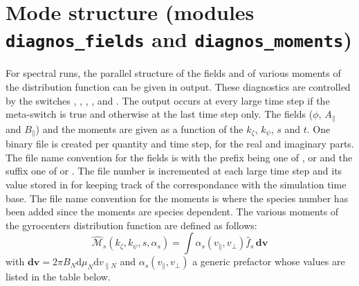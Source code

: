 \section{Mode structure (modules \texttt{diagnos\_fields} and \texttt{diagnos\_moments}) \label{sec.kykxs}}
For spectral runs, the parallel structure of the fields and of various moments of the distribution function can be given in output. These diagnostics are controlled by the switches , , , ,  and . The output occurs at every large time step if the meta-switch  is true and otherwise at the last time step only. 
The fields ($\phi$, $A_\parallel$ and $B_\parallel$) and the moments are given as a function of the $k_\zeta$, $k_\psi$, $s$ and $t$. 
One binary file is created per quantity and time step, for the real and imaginary parts. The file name convention for the fields is  with the prefix being one of ,  or  and the suffix one of  or . The file number is incremented at each large time step and its value stored in  for keeping track of the correspondance with the simulation time base. The file name convention for the moments is 
 where the species number has been added since the moments are species dependent. The various moments of the gyrocenters distribution function are defined as follows:
\begin{equation}
\mathcal{\hat{M}}_s(k_\zeta,k_\psi,s,\alpha_s) = \int \alpha_s(v_\parallel,v_\perp)\hat{f}_s\,\mathbf{\textrm{d}v}
\end{equation}
with $\mathbf{\textrm{d}v}=2\pi B_N\textrm{d}\mu_N\textrm{d}v_{\parallel N}$ and $\alpha_s(v_\parallel,v_\perp)$ a generic prefactor whose values are listed in the table below. 
